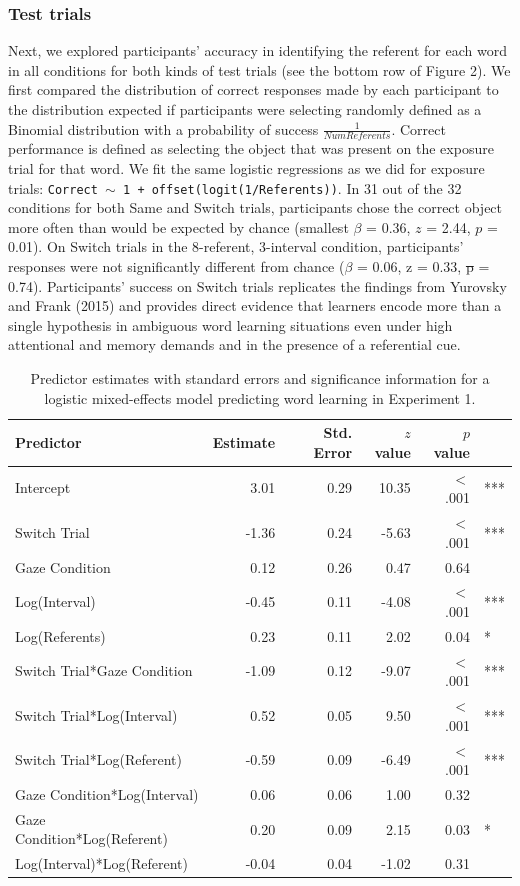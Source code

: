 \documentclass[authoryear, review]{elsarticle}
\providecommand{\DIFaddtex}[1]{{\protect\color{blue}\uwave{#1}}} %
\providecommand{\DIFdeltex}[1]{{\protect\color{red}\sout{#1}}}                      %
\providecommand{\DIFaddbegin}{} %
\providecommand{\DIFaddend}{} %
\providecommand{\DIFdelbegin}{} %
\providecommand{\DIFdelend}{} %
\providecommand{\DIFadd}[1]{\texorpdfstring{\DIFaddtex{#1}}{#1}} %
\providecommand{\DIFdel}[1]{\texorpdfstring{\DIFdeltex{#1}}{}} %
\begin{document}
\subsubsection{Test trials}\label{test-trials}

Next, we explored participants' accuracy in identifying the referent for
each word in all conditions for both kinds of test trials (see the
bottom row of Figure 2). We first compared the distribution of correct
responses made by each participant to the distribution expected if
participants were selecting randomly defined as a Binomial distribution
with a probability of success \(\frac{1}{Num Referents}\). Correct
performance is defined as selecting the object that was present on the
exposure trial for that word. We fit the same logistic regressions as we
did for exposure trials:
\texttt{Correct $\sim$ 1 + offset(logit(1/Referents))}. In 31 out of the
32 conditions for both Same and Switch trials, participants chose the
correct object more often than would be expected by chance (smallest
\(\beta\) = 0.36, \(z\) = 2.44, \(p\) = 0.01). On Switch trials in the
8-referent, 3-interval condition, participants' responses were not
significantly different from chance (\(\beta\) = 0.06, z = 0.33, \DIFdelbegin \DIFdel{p }\DIFdelend \DIFaddbegin \DIFadd{\(p\) }\DIFaddend =
0.74). Participants' success on Switch trials replicates the findings
from Yurovsky and Frank (2015) and provides direct evidence that
learners encode more than a single hypothesis in ambiguous word learning
situations even under high attentional and memory demands and in the
presence of a referential cue.

\begin{table}[tb]
\centering
\begin{tabular}{lrrrrl}
 Predictor & Estimate & Std. Error & $z$ value & $p$ value &  \\ 
  \hline
Intercept & 3.01 & 0.29 & 10.35 & $<$ .001 & *** \\ 
  Switch Trial & -1.36 & 0.24 & -5.63 & $<$ .001 & *** \\ 
  Gaze Condition & 0.12 & 0.26 & 0.47 & 0.64 &  \\ 
  Log(Interval) & -0.45 & 0.11 & -4.08 & $<$ .001 & *** \\ 
  Log(Referents) & 0.23 & 0.11 & 2.02 & 0.04 & * \\ 
  Switch Trial*Gaze Condition & -1.09 & 0.12 & -9.07 & $<$ .001 & *** \\ 
  Switch Trial*Log(Interval) & 0.52 & 0.05 & 9.50 & $<$ .001 & *** \\ 
  Switch Trial*Log(Referent) & -0.59 & 0.09 & -6.49 & $<$ .001 & *** \\ 
  Gaze Condition*Log(Interval) & 0.06 & 0.06 & 1.00 & 0.32 &  \\ 
  Gaze Condition*Log(Referent) & 0.20 & 0.09 & 2.15 & 0.03 & * \\ 
  Log(Interval)*Log(Referent) & -0.04 & 0.04 & -1.02 & 0.31 &  \\ 
   \hline
\end{tabular}
\caption{Predictor estimates with standard errors and significance information for a logistic mixed-effects model predicting word learning in Experiment 1.} 
\label{tab:exp1_reg}
\end{table}
\end{document}
